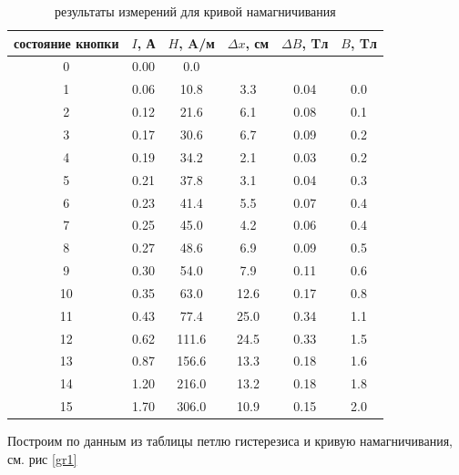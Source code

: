 \documentclass[a4paper,14pt]{article}
\begin{document}
\begin{table}[hbt!]
\begin{center}
\begin{tabular}{|c|c|c|c|c|c|}
	\hline
	состояние кнопки & $I$, А     & $H$, A/м          & $\Delta x$, см & $\Delta B$, Tл & $B$, Tл \\ \hline
	0                & 0.00 & 0.0   &             &              &     \\ \hline
	1                & 0.06 & 10.8  & 3.3         & 0.04         & 0.0 \\ \hline
	2                & 0.12 & 21.6  & 6.1         & 0.08         & 0.1 \\ \hline
	3                & 0.17 & 30.6  & 6.7         & 0.09         & 0.2 \\ \hline
	4                & 0.19 & 34.2  & 2.1         & 0.03         & 0.2 \\ \hline
	5                & 0.21 & 37.8  & 3.1         & 0.04         & 0.3 \\ \hline
	6                & 0.23 & 41.4  & 5.5         & 0.07         & 0.4 \\ \hline
	7                & 0.25 & 45.0  & 4.2         & 0.06         & 0.4 \\ \hline
	8                & 0.27 & 48.6  & 6.9         & 0.09         & 0.5 \\ \hline
	9                & 0.30 & 54.0  & 7.9         & 0.11         & 0.6 \\ \hline
	10               & 0.35 & 63.0  & 12.6        & 0.17         & 0.8 \\ \hline
	11               & 0.43 & 77.4  & 25.0        & 0.34         & 1.1 \\ \hline
	12               & 0.62 & 111.6 & 24.5        & 0.33         & 1.5 \\ \hline
	13               & 0.87 & 156.6 & 13.3        & 0.18         & 1.6 \\ \hline
	14               & 1.20 & 216.0 & 13.2        & 0.18         & 1.8 \\ \hline
	15               & 1.70 & 306.0 & 10.9        & 0.15         & 2.0 \\ \hline
	\end{tabular}
\caption{результаты измерений для кривой намагничивания}
\label{namagn}
\end{center}
\end{table}

\clearpage

Построим по данным из таблицы петлю гистерезиса и кривую намагничивания, см. рис \ref{gr1}
\end{document}
